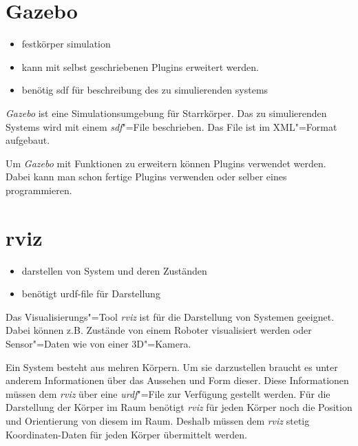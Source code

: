 
\section{Gazebo}
\begin{itemize}
\item festkörper simulation
\item kann mit selbst geschriebenen Plugins erweitert werden.
\item benötig sdf für beschreibung des zu simulierenden systems
\end{itemize}

\textit{Gazebo} ist eine Simulationsumgebung für Starrkörper.
Das zu simulierenden Systems wird mit einem \textit{sdf}"=File beschrieben. %
Das File ist im XML"=Format aufgebaut.

Um \textit{Gazebo} mit Funktionen zu erweitern können Plugins verwendet werden.
Dabei kann man schon fertige Plugins verwenden oder selber eines programmieren. %

\section{rviz}
\begin{itemize}
\item darstellen von System und deren Zuständen
\item benötigt urdf-file für Darstellung
\end{itemize}
Das Visualisierungs"=Tool \textit{rviz} ist für die Darstellung von Systemen geeignet.
Dabei können z.B. Zustände von einem Roboter visualisiert werden oder Sensor"=Daten wie von einer 3D"=Kamera.

Ein System besteht aus mehren Körpern.
Um sie darzustellen braucht es unter anderem Informationen über das Aussehen und Form dieser.
Diese Informationen müssen dem \textit{rviz} über eine \textit{urdf}"=File zur Verfügung gestellt werden. %
Für die Darstellung der Körper im Raum benötigt \textit{rviz} für jeden Körper noch die Position und Orientierung von diesem im Raum.
Deshalb müssen dem \textit{rviz} stetig Koordinaten-Daten für jeden Körper übermittelt werden. %


